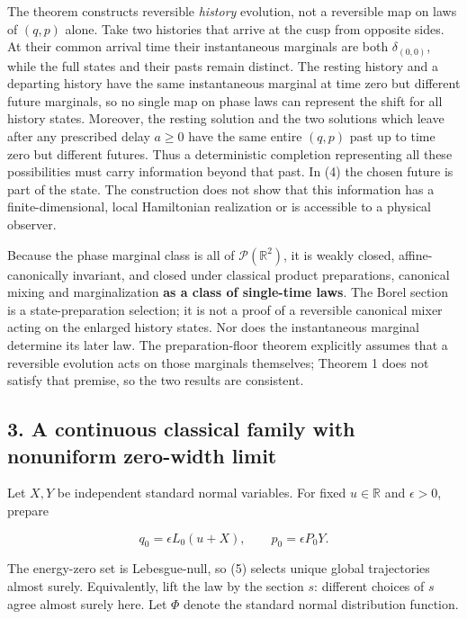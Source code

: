 \documentclass[11pt,a4paper]{article}
\begin{document}
The theorem constructs reversible \emph{history} evolution, not a
reversible map on laws of \((q,p)\) alone. Take two histories that
arrive at the cusp from opposite sides. At their common arrival time
their instantaneous marginals are both \(\delta_{(0,0)}\), while the
full states and their pasts remain distinct. The resting history and a
departing history have the same instantaneous marginal at time zero but
different future marginals, so no single map on phase laws can represent
the shift for all history states. Moreover, the resting solution and the
two solutions which leave after any prescribed delay \(a\ge0\) have the
same entire \((q,p)\) past up to time zero but different futures. Thus a
deterministic completion representing all these possibilities must carry
information beyond that past. In (4) the chosen future is part of the
state. The construction does not show that this information has a
finite-dimensional, local Hamiltonian realization or is accessible to a
physical observer.

Because the phase marginal class is all of \(\mathcal P(\mathbb R^2)\),
it is weakly closed, affine-canonically invariant, and closed under
classical product preparations, canonical mixing and marginalization
\textbf{as a class of single-time laws}. The Borel section is a
state-preparation selection; it is not a proof of a reversible canonical
mixer acting on the enlarged history states. Nor does the instantaneous
marginal determine its later law. The preparation-floor theorem
explicitly assumes that a reversible evolution acts on those marginals
themselves; Theorem 1 does not satisfy that premise, so the two results
are consistent.

\hypertarget{a-continuous-classical-family-with-nonuniform-zero-width-limit}{%
\subsection{3. A continuous classical family with nonuniform zero-width
limit}\label{a-continuous-classical-family-with-nonuniform-zero-width-limit}}

Let \(X,Y\) be independent standard normal variables. For fixed
\(u\in\mathbb R\) and \(\epsilon>0\), prepare

\[
 q_0=\epsilon L_0(u+X),\qquad p_0=\epsilon P_0Y. \tag{5}
\]

The energy-zero set is Lebesgue-null, so (5) selects unique global
trajectories almost surely. Equivalently, lift the law by the section
\(s\): different choices of \(s\) agree almost surely here. Let \(\Phi\)
denote the standard normal distribution function.
\end{document}
